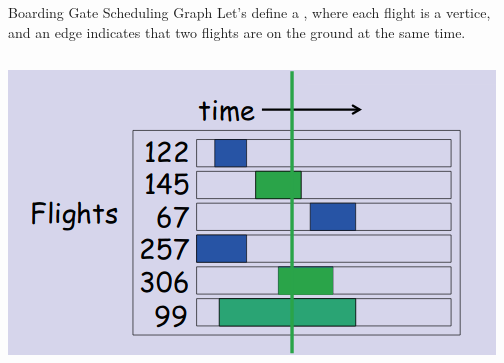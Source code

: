 \begin{frame}{Boarding Gate Scheduling Graph}
  Let's define a , where each flight is a vertice, and an edge indicates that \alert{two flights are on the ground at the same time}.

    \begin{columns}[T]
      \includegraphics[width=1\textwidth]{../img/gatetable}

    \end{columns}
\end{frame}

